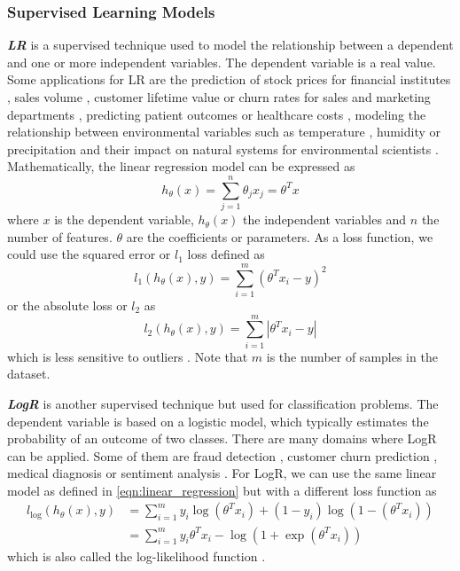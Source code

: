 \subsubsection*{Supervised Learning Models}
\label{subsubsec:supervised_learning_models}
\textbf{\emph{\acf{LR}}} is a supervised technique used to model the relationship between a dependent and one or more independent variables. The dependent variable is a real value. Some applications for \ac{LR} are the prediction of stock prices for financial institutes \cite{bhuriya2017stock}, sales volume \cite{todua2013multiple}, customer lifetime value \cite{malthouse2005can} or churn rates \cite{hadden2008churn} for sales and marketing departments \cite{maulud2020review}, predicting patient outcomes \cite{lewis2007regression} or healthcare costs \cite{soyiri2013overview}, modeling the relationship between environmental variables such as temperature \cite{radhika2009atmospheric}, humidity \cite{vamseekrishna2021prediction} or precipitation \cite{naoum2004orographic} and their impact on natural systems for environmental scientists \cite{shen2015precipitation}. Mathematically, the linear regression model can be expressed as
\begin{equation}
    h_{\theta}(x)= \sum_{j=1}^n \theta_j x_j=\theta^T x
    \label{eqn:linear_regression}
\end{equation}
where $x$ is the dependent variable, $h_\theta(x)$ the independent variables and $n$ the number of features. $\theta$ are the coefficients or parameters. As a loss function, we could use the squared error or $l_1$ loss defined as
\begin{equation}
    l_1(h_{\theta}(x),y)=\sum_{i=1}^m(\theta^T x_i-y)^2
\end{equation}
or the absolute loss or $l_2$ as
\begin{equation}
    l_2(h_{\theta}(x),y)=\sum_{i=1}^m|\theta^T x_i-y|
\end{equation}
which is less sensitive to outliers \cite{thanoon2015robust}\cite{su2012linear}. Note that $m$ is the number of samples in the dataset.

\textbf{\emph{\acf{LogR}}} is another supervised technique but used for classification problems. The dependent variable is based on a logistic model, which typically estimates the probability of an outcome of two classes. There are many domains where \ac{LogR} can be applied. Some of them are fraud detection \cite{sahin2011detecting}, customer churn prediction \cite{de2018new}, medical diagnosis \cite{tsien1998using} or sentiment analysis \cite{ramadhan2017sentiment}. For \ac{LogR}, we can use the same linear model as defined in \ref{eqn:linear_regression} but with a different loss function as
\begin{equation}
    \begin{split}
        l_{\log}(h_{\theta}(x),y) & =\sum_{i=1}^m y_i \log(\theta^T x_i) + (1-y_i)\log(1-(\theta^T x_i))\\
        & =\sum_{i=1}^m y_i \theta^T x_i - \log(1+ \exp(\theta^T x_i))
    \end{split}
\end{equation}
which is also called the log-likelihood function \cite{hastie2009elements}.

